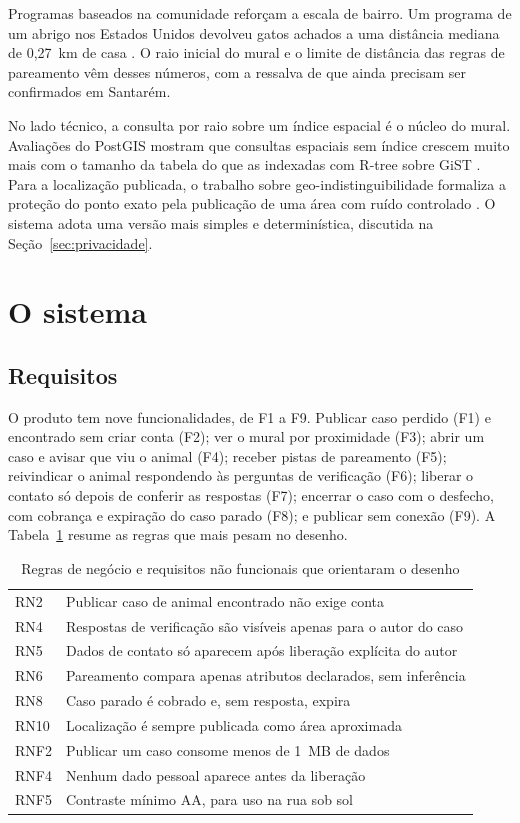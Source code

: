 \documentclass[12pt]{article}
\begin{document}
Programas baseados na comunidade reforçam a escala de bairro. Um programa de um
abrigo nos Estados Unidos devolveu gatos achados a uma distância mediana de
0,27~km de casa \cite{dalrymple2025}. O raio inicial do mural e o limite de
distância das regras de pareamento vêm desses números, com a ressalva de que
ainda precisam ser confirmados em Santarém.

No lado técnico, a consulta por raio sobre um índice espacial é o núcleo do
mural. Avaliações do PostGIS mostram que consultas espaciais sem índice crescem
muito mais com o tamanho da tabela do que as indexadas com R-tree sobre GiST
\cite{nguyen2009}. Para a localização publicada, o trabalho sobre
geo-indistinguibilidade formaliza a proteção do ponto exato pela publicação de
uma área com ruído controlado \cite{andres2013}. O sistema adota uma versão mais
simples e determinística, discutida na Seção~\ref{sec:privacidade}.

\section{O sistema}

\subsection{Requisitos}

O produto tem nove funcionalidades, de F1 a F9. Publicar caso perdido (F1) e
encontrado sem criar conta (F2); ver o mural por proximidade (F3); abrir um caso e
avisar que viu o animal (F4); receber pistas de pareamento (F5); reivindicar o
animal respondendo às perguntas de verificação (F6); liberar o contato só depois
de conferir as respostas (F7); encerrar o caso com o desfecho, com cobrança e
expiração do caso parado (F8); e publicar sem conexão (F9). A
Tabela~\ref{tab:requisitos} resume as regras que mais pesam no desenho.

\begin{table}[ht]
\centering
\caption{Regras de negócio e requisitos não funcionais que orientaram o desenho}
\label{tab:requisitos}
\begin{tabularx}{\textwidth}{lX}
\toprule
RN2 & Publicar caso de animal encontrado não exige conta \\
RN4 & Respostas de verificação são visíveis apenas para o autor do caso \\
RN5 & Dados de contato só aparecem após liberação explícita do autor \\
RN6 & Pareamento compara apenas atributos declarados, sem inferência \\
RN8 & Caso parado é cobrado e, sem resposta, expira \\
RN10 & Localização é sempre publicada como área aproximada \\
RNF2 & Publicar um caso consome menos de 1~MB de dados \\
RNF4 & Nenhum dado pessoal aparece antes da liberação \\
RNF5 & Contraste mínimo AA, para uso na rua sob sol \\
\bottomrule
\end{tabularx}
\end{table}
\end{document}
